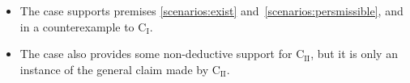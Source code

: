 \documentclass[10pt]{article}
\begin{document}
\begin{itemize}[noitemsep]
\item The case supports premises \ref{scenarios:exist} and~\ref{scenarios:persmissible}, and in a counterexample to C\(_{\text{I}}\).

\item The case also provides some non-deductive support for C\(_{\text{II}}\), but it is only an instance of the general claim made by C\(_{\text{II}}\).
\end{itemize}












\end{document}

